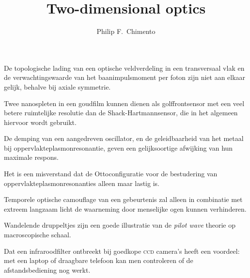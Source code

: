 \documentclass[10pt]{stellingen}
\newcommand\smallcaps[1]{{\scshape\MakeTextLowercase{#1}}}
\begin{document}
\title{Two-dimensional optics}
\author{Philip F.~Chimento}
\maketitle


\begin{stelling}
De topologische lading van een optische veldverdeling in een transversaal vlak en de verwachtingswaarde van het baanimpulsmoment per foton zijn niet aan elkaar gelijk, behalve bij axiale symmetrie.
\end{stelling}

\begin{stelling}
Twee nanospleten in een goudfilm kunnen dienen als golffrontsensor met een veel betere ruimtelijke resolutie dan de Shack-Hartmannsensor, die in het algemeen hiervoor wordt gebruikt.
\end{stelling}

\begin{stelling}
De demping van een aangedreven oscillator, en de geleidbaarheid van het metaal bij oppervlakteplasmonresonantie, geven een gelijksoortige afwijking van hun maximale respons.
\end{stelling}

\begin{stelling}
Het is een misverstand dat de Ottoconfiguratie voor de bestudering van oppervlakteplasmonresonanties alleen maar lastig is.
\end{stelling}


\begin{stelling}
Temporele optische camouflage van een gebeurtenis zal alleen in combinatie met extreem langzaam licht de waarneming door menselijke ogen kunnen verhinderen.
\end{stelling}

\begin{stelling}
Wandelende druppeltjes zijn een goede illustratie van de \emph{\foreignlanguage{english}{pilot wave}} theorie op macroscopische schaal.
\end{stelling}

\begin{stelling}
Dat een infraroodfilter ontbreekt bij goedkope \smallcaps{ccd} camera's heeft een voordeel: met een laptop of draagbare telefoon kan men controleren of de afstandsbediening nog werkt.
\end{stelling}
\end{document}
